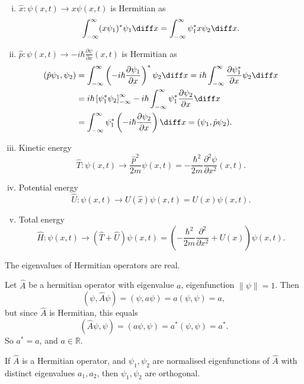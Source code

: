 \documentclass[12pt]{article}
\begin{document}
\begin{exbox}
	\begin{enumerate}[(i)]
		\item $\hat x : \psi(x, t) \to x \psi(x, t)$ is Hermitian as
			\[
				\int_{-\infty}^{\infty}(x\psi_1)^{\ast}\psi_1\diff x = \int_{-\infty}^{\infty}\psi_1^{\ast} x \psi_2 \diff x
			.\]
		\item $\hat p : \psi(x, t) \to -i\hbar \frac{\partial \psi}{\partial x}(x, t)$ is Hermitian as
			\begin{align*}
				(\hat p \psi_1, \psi_2) &= \int_{-\infty}^{\infty} \left(-i\hbar \frac{\partial \psi_1}{\partial x}\right)^{\ast} \psi_2 \diff x = i \hbar \int_{-\infty}^{\infty}\frac{\partial \psi_1^{\ast}}{\partial x}\psi_2 \diff x \\
							&= i \hbar \left[\psi_1^{\ast} \psi_2\right]_{-\infty}^{\infty} - i \hbar \int_{-\infty}^{\infty} \psi_1^{\ast} \frac{\partial \psi_2}{\partial x}\diff x \\
							&= \int_{-\infty}^{\infty} \psi_1^{\ast} \left(-i\hbar \frac{\partial \psi_2}{\partial x}\right) \diff x = (\psi_1, \hat p \psi_2).
			\end{align*}
		\item Kinetic energy
			\[
				\hat T : \psi(x, t) \to \frac{\hat p^2}{2m} \psi(x, t) = - \frac{\hbar^2}{2m} \frac{\partial^2 \psi}{\partial x^2}(x, t)
			.\]
		\item Potential energy
			\[
				\hat U : \psi(x, t) \to U(\hat x)\psi(x, t) = U(x)\psi(x, t)
			.\]
		\item Total energy
			\[
				\hat H : \psi(x, t) \to (\hat T + \hat U)\psi(x, t) = \left(- \frac{\hbar^2}{2m} \frac{\partial^2}{\partial x^2} + U(x) \right) \psi(x, t)
			.\]
	\end{enumerate}
\end{exbox}

\begin{theorem}
	The eigenvalues of Hermitian operators are real.
\end{theorem}

\begin{proofbox}
Let $\hat A$ be a hermitian operator with eigenvalue $a$, eigenfunction $\|\psi\| = 1$. Then
\[
	(\psi, \hat A \psi) = (\psi, a \psi) = a(\psi, \psi) = a
,\]
but since $\hat A$ is Hermitian, this equals
\[
	(\hat A \psi, \psi) = (a \psi, \psi) = a^{\ast} (\psi, \psi) = a^{\ast}
.\]
So $a^{\ast} = a$, and $a \in \mathbb{R}$.
\end{proofbox}


\begin{theorem}
	If $\hat A$ is a Hermitian operator, and $\psi_1, \psi_2$ are normalised eigenfunctions of $\hat A$ with distinct eigenvalues $a_1, a_2$, then $\psi_1, \psi_2$ are orthogonal.
\end{theorem}
\end{document}
